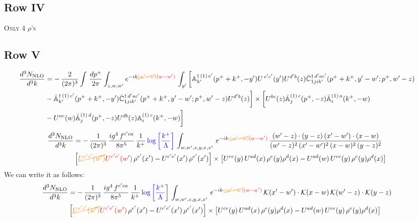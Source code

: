 \documentclass[9pt]{article}
\def\mf#1{\mathbb{#1}}
\numberwithin{equation}{section}
\begin{document}
\subsection{Row IV}
\textsc{Only 4 $\rho$'s}
\subsection{Row V}
\begin{align}
 \frac{d^{3}N_{\rm NLO}}{d^{3}k} & =   -\,\frac{2}{(2\pi)^{3}} \int\, \frac{dp^{+}}{2\pi}\int_{z,w,w^{\prime}} e^{-ik{\color{orange}\cancel{(w^{\prime}-w)}}{\color{red}(w-w^{\prime})}}\,\int_{y^{\prime}}\bigg[\mf{A}^{\dagger\, (1)\,e^{\prime}}_{k^{\prime}}(p^{+}+k^{+},-y^{\prime})U^{\, e^{\prime}c^{\prime}}(y^{\prime})U^{d^{\prime}b}(z) \Bar{\mf{C}}^{\dagger\, d^{\prime}ac^{\prime}}_{1jik^{\prime}}(p^{+}+k^{+},y^{\prime}-w^{\prime}; p^{+},w^{\prime}-z) \notag \\ & -\Bar{\mf{A}}^{\dagger\, (1)\,c^{\prime}}_{k^{\prime}}(p^{+}+k^{+},-y^{\prime}) \Bar{\mf{C}}^{\dagger\, d^{\prime}ac^{\prime}}_{1jik^{\prime}}(p^{+}+k^{+},y^{\prime}-w^{\prime}; p^{+},w^{\prime}-z)U^{d^{\prime}b}(z)\bigg] \times  \bigg[U^{bc}(z)\Bar{\mf{A}}^{(1)\, c}_{j}(p^{+},-z)\Bar{\mf{A}}^{(1)\, a}_{i}(k^{+},-w)\notag \\ & -U^{ac}(w) \Bar{\mf{A}}^{(1)\, d}_{j}(p^{+},-z)U^{db}(z) \mf{A}^{(1)\, c}_{i}(k^{+},- w)\bigg]\nonumber
\end{align}
\begin{align}
 \frac{d^{3}N_{\rm NLO}}{d^{3}k} & =    -\,\frac{1}{(2\pi)^{3}}\, \frac{ig^{4}\,f^{c'ca}}{8\pi^{5}}\, \frac{1}{k^{+}}\,{\color{blue}\log{\left[\frac{k^{+}}{\Lambda}\right]}}\, \int_{w,w',z,y,x,x'}\, e^{-ik\cdot {\color{orange}\cancel{(w'-w)}}{\color{red}(w-w')}}\,\frac{(w'-z)\cdot (y-z)\,(x'-w')\cdot (x-w)}{(w'-z)^{2}\,(x'-w')^{2}\,(x-w)^{2}\,(y-z)^{2}}\notag \\ & \left[{\color{orange}\cancel{U^{e'c'}(w')}}{\color{red}U^{c'e'}(w')}\,\rho^{e'}(x')-U^{c'e'}(x')\,\rho^{e'}(x')\right]\times  \left[U^{ce}(y)\,U^{ad}(x)\,\rho^{e}(y)\rho^{d}(x)-U^{ad}(w)\,U^{ce}(y)\,\rho^{e}(y)\rho^{d}(x)\right]
\end{align}
We can write it as follows: 
\begin{align}
 \frac{d^{3}N_{\rm NLO}}{d^{3}k} & =    -\,\frac{1}{(2\pi)^{3}}\, \frac{ig^{4}\,f^{c'ca}}{8\pi^{5}}\, \frac{1}{k^{+}}\,{\color{blue}\log{\left[\frac{k^{+}}{\Lambda}\right]}}\, \int_{w,w',z,y,x,x'}\, e^{-ik\cdot {\color{orange}\cancel{(w'-w)}}{\color{red}(w-w')}}\,\mathcal{K}(x'-w')\cdot \mathcal{K}(x-w)\,\mathcal{K}(w'-z)\cdot \mathcal{K}(y-z)\notag \\ & \left[{\color{orange}\cancel{U^{e'c'}(w')}}{\color{red}U^{c'e'}(w')}\,\rho^{e'}(x')-U^{c'e'}(x')\,\rho^{e'}(x')\right]\times  \left[U^{ce}(y)\,U^{ad}(x)\,\rho^{e}(y)\rho^{d}(x)-U^{ad}(w)\,U^{ce}(y)\,\rho^{e}(y)\rho^{d}(x)\right]
\end{align}
\end{document}

